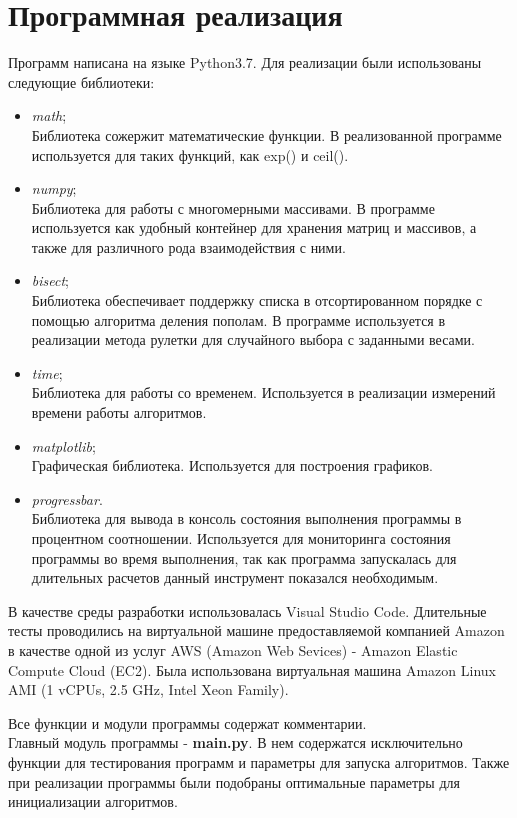 \documentclass{article}
\numberwithin{equation}{section}
\begin{document}
	\newpage
	\section{Программная реализация}
		Программ написана на языке Python3.7. Для реализации были использованы следующие библиотеки:
		\begin{itemize}
			\item \textit{math};\\
				Библиотека сожержит математические функции. В реализованной программе используется для таких функций, как exp() и ceil().
			\item \textit{numpy};\\
				Библиотека для работы с многомерными массивами. В программе используется как удобный контейнер для хранения матриц и массивов, а также для различного рода взаимодействия с ними.
			\item \textit{bisect};\\
				Библиотека обеспечивает поддержку списка в отсортированном порядке с помощью алгоритма деления пополам. В программе используется в реализации метода рулетки для случайного выбора с заданными весами.
			\item \textit{time};\\
				Библиотека для работы со временем. Используется в реализации измерений времени работы алгоритмов.
			\item \textit{matplotlib};\\
				Графическая библиотека. Используется для построения графиков.
			\item \textit{progressbar}.\\
				Библиотека для вывода в консоль состояния выполнения программы в процентном соотношении. Используется для мониторинга состояния программы во время выполнения, так как программа запускалась для длительных расчетов данный инструмент показался необходимым.
		\end{itemize}

		В качестве среды разработки использовалась Visual Studio Code. Длительные тесты проводились на виртуальной машине предоставляемой компанией Amazon в качестве одной из услуг AWS (Amazon Web Sevices) - Amazon Elastic Compute Cloud (EC2). Была использована виртуальная машина Amazon Linux AMI (1 vCPUs, 2.5 GHz, Intel Xeon Family).

		Все функции и модули программы содержат комментарии.\\
		Главный модуль программы - \textbf{main.py}. В нем содержатся исключительно функции для тестирования программ и параметры для запуска алгоритмов. Также при реализации программы были подобраны оптимальные параметры для инициализации алгоритмов.
\end{document}

